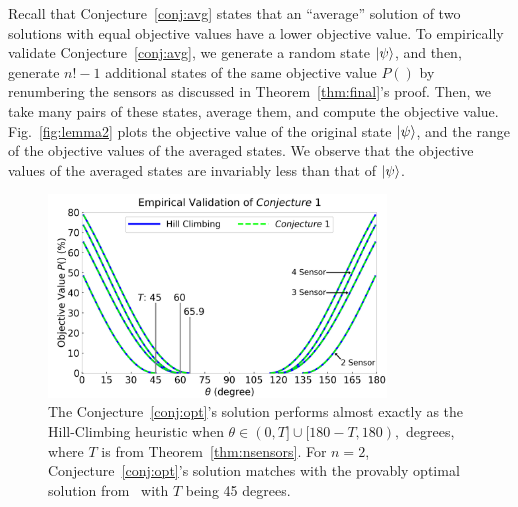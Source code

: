 Recall that Conjecture~\ref{conj:avg} states that an ``average'' solution 
of two \iso solutions with
equal objective values have a lower objective value. To empirically validate
Conjecture~\ref{conj:avg}, we generate a random state $\ket{\psi}$, and then, 
generate  $n!-1$ additional states of the same objective value $P()$ by 
renumbering the sensors as discussed in Theorem~\ref{thm:final}'s proof. 
Then, we take many pairs of these states, average them, and compute the
objective value. 
Fig.~\ref{fig:lemma2} plots the objective value of the original state $\ket{\psi}$,
and the range of the objective values of the averaged states. We observe that the
objective values of the averaged states are invariably less than that of 
$\ket{\psi}$. 

\begin{figure}
    \centering
    \includegraphics[width=0.8\textwidth]{chapters/tqc/figures/conjecture.png}
    \caption{The Conjecture~\ref{conj:opt}'s solution performs almost exactly as the Hill-Climbing heuristic when $\theta \in (0, T] \cup [180-T, 180),$ degrees, where $T$ is from Theorem~\ref{thm:nsensors}. 
    For $n=2$, Conjecture~\ref{conj:opt}'s solution matches with the provably optimal solution from~\cite{PhysRevA.qsn} with $T$ being 45 degrees.}
    \label{fig:conjecture}
\end{figure}

